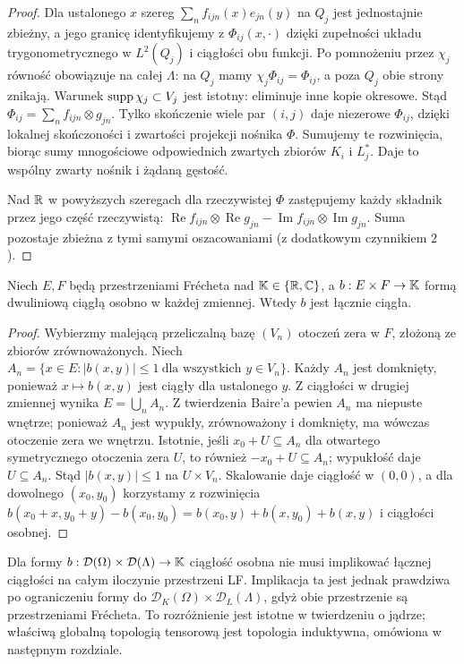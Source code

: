 \begin{proof}
Dla ustalonego $x$ szereg $\sum_n f_{ijn}(x)e_{jn}(y)$
na $Q_j$ jest jednostajnie zbieżny, a jego granicę
identyfikujemy z $\Phi_{ij}(x,\cdot)$ dzięki
zupełności układu trygonometrycznego w $L^2(Q_j)$
i ciągłości obu funkcji. Po pomnożeniu przez $\chi_j$
równość obowiązuje na całej $\Lambda$: na $Q_j$
mamy $\chi_j\Phi_{ij}=\Phi_{ij}$, a poza $Q_j$
obie strony znikają. Warunek $\operatorname{supp}\chi_j\subset V_j$
jest istotny: eliminuje inne kopie okresowe.
Stąd $\Phi_{ij}=\sum_n f_{ijn}\otimes g_{jn}$.
Tylko skończenie wiele par $(i,j)$ daje niezerowe
$\Phi_{ij}$, dzięki lokalnej skończoności i zwartości
projekcji nośnika $\Phi$. Sumujemy te rozwinięcia,
biorąc sumy mnogościowe odpowiednich zwartych zbiorów
$K_i$ i $L_j^*$. Daje to wspólny zwarty nośnik
i żądaną gęstość.

Nad $\mathbb R$ w powyższych szeregach dla rzeczywistej $\Phi$
zastępujemy każdy składnik przez jego część rzeczywistą:
$\operatorname{Re}f_{ijn}\otimes\operatorname{Re}g_{jn}
-\operatorname{Im}f_{ijn}\otimes\operatorname{Im}g_{jn}$.
Suma pozostaje zbieżna z tymi samymi oszacowaniami
(z dodatkowym czynnikiem $2$).
\end{proof}

\begin{lemat}
\label{lem:separate-joint23}
Niech $E,F$ będą przestrzeniami Frécheta nad
$\mathbb K\in\{\mathbb R,\mathbb C\}$, a $b:E\times F\to\mathbb K$
formą dwuliniową ciągłą osobno w każdej zmiennej.
Wtedy $b$ jest łącznie ciągła.
\end{lemat}
\begin{proof}
Wybierzmy malejącą przeliczalną bazę
$(V_n)$ otoczeń zera w $F$, złożoną ze zbiorów
zrównoważonych. Niech
$A_n=\{x\in E: |b(x,y)|\le1\ \text{dla wszystkich }y\in V_n\}$.
Każdy $A_n$ jest domknięty, ponieważ $x\mapsto b(x,y)$
jest ciągły dla ustalonego $y$. Z ciągłości w drugiej
zmiennej wynika $E=\bigcup_n A_n$.
Z twierdzenia Baire'a pewien $A_n$ ma niepuste wnętrze;
ponieważ $A_n$ jest wypukły, zrównoważony i domknięty,
ma wówczas otoczenie zera we wnętrzu. Istotnie,
jeśli $x_0+U\subseteq A_n$ dla otwartego symetrycznego
otoczenia zera $U$, to również $-x_0+U\subseteq A_n$;
wypukłość daje $U\subseteq A_n$.
Stąd $|b(x,y)|\le1$ na $U\times V_n$.
Skalowanie daje ciągłość w $(0,0)$, a dla
dowolnego $(x_0,y_0)$ korzystamy z rozwinięcia
$b(x_0+x,y_0+y)-b(x_0,y_0)
=b(x_0,y)+b(x,y_0)+b(x,y)$ i ciągłości osobnej.
\end{proof}

\begin{uwaga}
\label{rem:kernel-separate23}
Dla formy $b:\mathcal D(\Omega)\times\mathcal D(\Lambda)\to\mathbb K$
ciągłość osobna nie musi implikować łącznej ciągłości na
całym iloczynie przestrzeni LF. Implikacja ta jest jednak
prawdziwa po ograniczeniu formy do
$\mathcal D_K(\Omega)\times\mathcal D_L(\Lambda)$,
gdyż obie przestrzenie są przestrzeniami Frécheta.
To rozróżnienie jest istotne w twierdzeniu o jądrze;
właściwą globalną topologią tensorową jest topologia
induktywna, omówiona w następnym rozdziale.
\end{uwaga}

